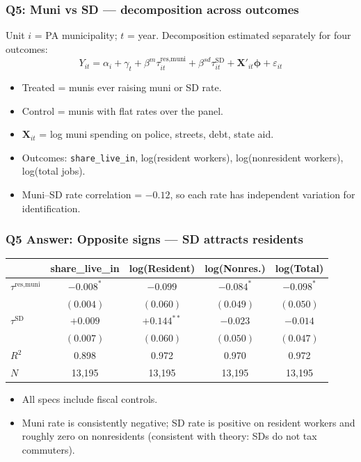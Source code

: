 \documentclass[xcolor = x11names, compress, aspectratio = 169]{beamer}
\renewcommand{\(}{\begin{columns}}
\renewcommand{\)}{\end{columns}}
\newcommand{\<}[1]{\begin{column}{#1}}
\renewcommand{\>}{\end{column}}
\begin{document}
\begin{frame}
\frametitle{Q5: Muni vs SD --- decomposition across outcomes}
    Unit $i$ = PA municipality; $t$ = year. Decomposition
    estimated separately for four outcomes:
    \[
    Y_{it} = \alpha_i + \gamma_t + \beta^m \tau^{\text{res,muni}}_{it} + \beta^{sd} \tau^{\text{SD}}_{it} + \mathbf{X}'_{it}\boldsymbol{\phi} + \varepsilon_{it}
    \]
    \footnotesize
    \begin{itemize}
        \item Treated = munis ever raising muni or SD rate.
        \item Control = munis with flat rates over the panel.
        \item $\mathbf{X}_{it}$ = log muni spending on police, streets,
        debt, state aid.
        \item Outcomes: \texttt{share\_live\_in}, log(resident workers),
        log(nonresident workers), log(total jobs).
        \item Muni--SD rate correlation = $-0.12$, so each rate has
        independent variation for identification.
    \end{itemize}
\end{frame}

\begin{frame}
\frametitle{Q5 Answer: Opposite signs --- SD attracts residents}
    \centering
    \small
    \begin{tabular}{lcccc}
        \toprule
        & share\_live\_in & log(Resident) & log(Nonres.) & log(Total) \\
        \midrule
        $\tau^{\text{res,muni}}$ & $-0.008^{*}$ & $-0.099$ & $-0.084^{*}$ & $-0.098^{*}$ \\
                                  & $(0.004)$ & $(0.060)$ & $(0.049)$ & $(0.050)$ \\
        $\tau^{\text{SD}}$       & $+0.009$ & $+0.144^{**}$ & $-0.023$ & $-0.014$ \\
                                  & $(0.007)$ & $(0.060)$ & $(0.050)$ & $(0.047)$ \\
        \midrule
        $R^2$                    & 0.898 & 0.972 & 0.970 & 0.972 \\
        $N$                      & 13{,}195 & 13{,}195 & 13{,}195 & 13{,}195 \\
        \bottomrule
    \end{tabular}
    \vspace{0.1cm}
    \begin{itemize}\setlength{\itemsep}{0.04cm}\small
        \item All specs include fiscal controls.
        \item Muni rate is consistently negative; SD rate is positive on
        resident workers and roughly zero on nonresidents
        (consistent with theory: SDs do not tax commuters).
    \end{itemize}
\end{frame}
\end{document}
